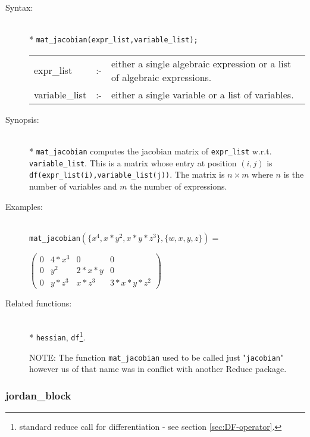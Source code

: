 \begin{description}
\item[Syntax:]\mbox{}\\*
\texttt{mat\_jacobian(expr\_list,variable\_list);}\\[2mm]
\begin{tabular}{l l p{.72\linewidth}}
expr\_list  &:-& either a
single algebraic expression or a list of algebraic expressions.\\
variable\_list &:-& either a single variable or a list of variables.
\end{tabular}

\item[Synopsis:]\mbox{}\\*
\texttt{mat\_jacobian} computes the jacobian matrix of \texttt{expr\_list} w.r.t.
\texttt{variable\_list}.
This is a matrix whose entry at position $(i,j)$
is \texttt{df(expr\_list(i),variable\_list(j))}.  The matrix is $n\times m$
where $n$ is the number of variables and $m$ the number of expressions.

\item[Examples:]\mbox{}\\
  \texttt{mat\_jacobian}\((\{x^4,x*y^2,x*y*z^3\},\{w,x,y,z\}) =\)

  \(\begin{pmatrix} 0 & 4*x^3 & 0 & 0 \\ 0 & y^2 & 2*x*y & 0 \\
  0 & y*z^3 & x*z^3 & 3*x*y*z^2
  \end{pmatrix}\)

\item[Related functions:]\mbox{}\\*
\texttt{hessian}, \texttt{df}\footnote{standard reduce call
for differentiation - see section \protect\ref{sec:DF-operator}.}.

NOTE: The function \texttt{mat\_jacobian} used to be called just "\texttt{jacobian}"
however us of that name was in conflict with another Reduce package.
\end{description}


\subsubsection{jordan\_block}
\label{linalg:jordan_block}
\hypertarget{operator:JORDAN_BLOCK}{}

